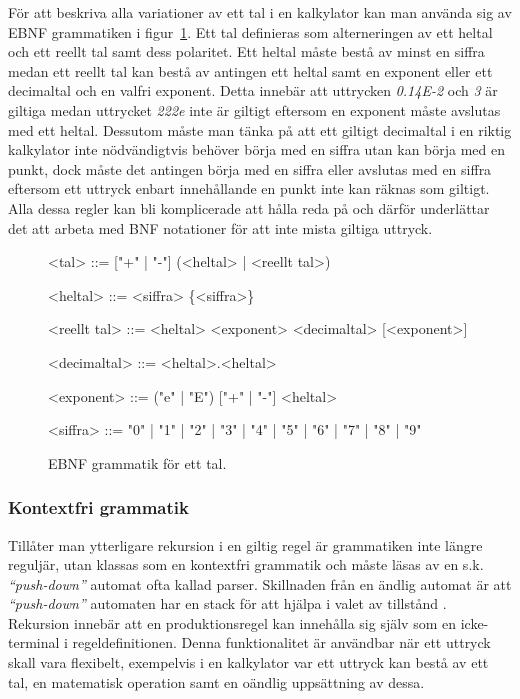 För att beskriva alla variationer av ett tal i en kalkylator kan man
använda sig av EBNF grammatiken i figur~\ref{fig:reg}. Ett tal definieras som
alterneringen av ett heltal och ett reellt tal samt dess polaritet. Ett heltal
måste bestå av minst en siffra medan ett reellt tal kan bestå av antingen ett
heltal samt en exponent eller ett decimaltal och en valfri exponent. Detta
innebär att uttrycken \textit{0.14E-2} och \textit{3} är giltiga medan
uttrycket \textit{222e} inte är giltigt eftersom en exponent måste avslutas
med ett heltal. Dessutom måste man tänka på att ett giltigt decimaltal i en
riktig kalkylator inte nödvändigtvis behöver börja med en siffra utan kan
börja med en punkt, dock måste det antingen börja med en siffra eller avslutas
med en siffra eftersom ett uttryck enbart innehållande en punkt inte kan
räknas som giltigt. Alla dessa regler kan bli komplicerade att hålla reda på
och därför underlättar det att arbeta med BNF notationer för att inte mista
giltiga uttryck.

\begin{figure}[ht]
  \begin{grammar}
    \singlespace\small%
    \selectfont

    <tal> ::= ["+" | "-"] (<heltal> | <reellt tal>)

    <heltal> ::= <siffra> \{<siffra>\}

    <reellt tal> ::= <heltal> <exponent>
      \alt <decimaltal> [<exponent>]

    <decimaltal> ::= <heltal>.<heltal>

    <exponent> ::= ("e" | "E") ["+" | "-"] <heltal>

    <siffra> ::= "0" | "1" | "2" | "3" | "4" | "5" | "6" | "7" | "8" | "9"

  \end{grammar}
  \caption{EBNF grammatik för ett tal.}
  \label{fig:reg}
\end{figure}

\subsubsection{Kontextfri grammatik}

Tillåter man ytterligare rekursion i en giltig regel är grammatiken inte
längre reguljär, utan klassas som en kontextfri grammatik och måste läsas av
en s.k. \textit{``push-down''} automat ofta kallad parser. Skillnaden från en
ändlig automat är att \textit{``push-down''} automaten har en stack för att
hjälpa i valet av tillstånd \citep[s.  100]{sm09}. Rekursion innebär att en
produktionsregel kan innehålla sig själv som en icke-terminal i
regeldefinitionen. Denna funktionalitet är användbar när ett uttryck skall
vara flexibelt, exempelvis i en kalkylator var ett uttryck kan bestå av ett
tal, en matematisk operation samt en oändlig uppsättning av dessa.

